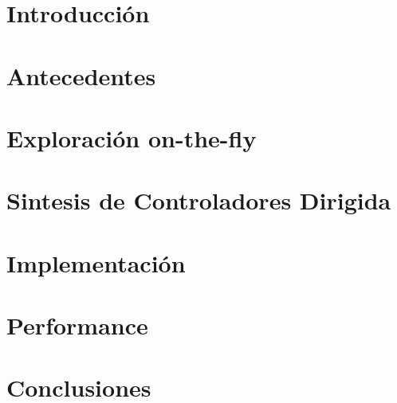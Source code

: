 \documentclass[11pt,a4paper,twoside]{tesis}
\begin{document}

\def\autor{Mat\'ias Duran, Florencia Zanollo}
\def\tituloTesis{TESIS\\Síntesis Dirigida de Controladores\\para Requerimientos de tipo\\Non-Blocking No Maximales}
\def\runtitulo{Sintesis de Controladores Dirigida}
\def\runtitle{Directed Controller Synthesis}
\def\director{Sebasti\'an Uchitel}
\def\lugar{Buenos Aires, 2021}


\frontmatter
\pagestyle{empty}


\cleardoublepage

\cleardoublepage


\cleardoublepage
\tableofcontents

\mainmatter
\pagestyle{headings}




\chapter{Introducción}


\chapter{Antecedentes}\label{chpt:background}


\chapter{Exploración on-the-fly}\label{chpt:on-the-fly}


\chapter{Sintesis de Controladores Dirigida}\label{chpt:dcs}


\chapter{Implementación}\label{chpt:implementation}


\chapter{Performance}\label{chpt:performance}


\chapter{Conclusiones}\label{chpt:conclusiones}


\backmatter

\end{document}
